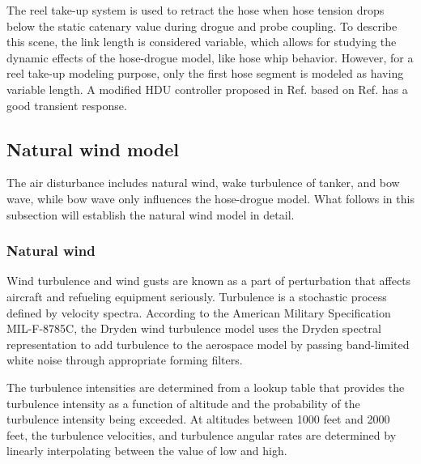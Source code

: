 The reel take-up system is used to retract the hose when hose tension drops below the static catenary value during drogue and probe coupling. To describe this scene, the link length is considered variable, which allows for studying the dynamic effects of the hose-drogue model, like hose whip behavior. However, for a reel take-up modeling purpose, only the first hose segment is modeled as having variable length. A modified HDU controller proposed in Ref.\cite{dai2019hose} based on Ref.\cite{vassberg2003numerical,ro2010modeling} has a good transient response.

\subsection{Natural wind model  }\label{sec3.3}
The air disturbance includes natural wind, wake turbulence of tanker, and bow wave, while bow wave only influences the hose-drogue model. What follows in this subsection will establish the natural wind model in detail.

\subsubsection{Natural wind }\label{sec3.3.1}
Wind turbulence and wind gusts are known as a part of perturbation that affects aircraft and refueling equipment seriously. Turbulence is a stochastic process defined by velocity spectra. According to the American Military Specification MIL-F-8785C\cite{moorhouse1980}, the Dryden wind turbulence model uses the Dryden spectral representation to add turbulence to the aerospace model by passing band-limited white noise through appropriate forming filters.

The turbulence intensities are determined from a lookup table that provides the turbulence intensity as a function of altitude and the probability of the turbulence intensity being exceeded. At altitudes between 1000 feet and 2000 feet, the turbulence velocities, and turbulence angular rates are determined by linearly interpolating between the value of low and high.                                                                                          

